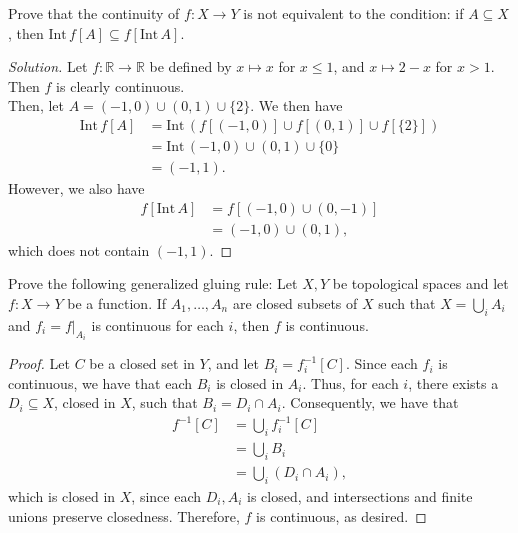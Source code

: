 \documentclass[12pt]{article}
\newenvironment{problem}[2][Problem]{\begin{trivlist}
\item[\hskip \labelsep {\bfseries #1}\hskip \labelsep {\bfseries #2.}]}{\end{trivlist}}
\newcommand{\Int}[1]{\text{Int}\,#1}
\newcommand{\R}{\mathbb{R}}
\newenvironment{solution}
  {\renewcommand\qedsymbol{$\blacksquare$}\begin{proof}[Solution]}
{\end{proof}}
\begin{document}
\newpage

\begin{problem}{6.7}
  Prove that the continuity of $f:X\to Y$ is not equivalent to the condition:
  if $A\subseteq X$, then $\Int f[A]\subseteq f[\Int A]$.
\end{problem}
\begin{solution}
  Let $f:\R\to\R$ be defined by $x\mapsto x$ for $x\leq 1$, and 
  $x\mapsto 2-x$ for $x>1$.
  Then $f$ is clearly continuous. \\
  \indent Then, let $A=(-1,0)\cup(0,1)\cup\{2\}$.
  We then have
  \begin{align*}
    \Int f[A] &= \Int(f[(-1,0)]\cup f[(0,1)]\cup f[\{2\}]) \\
    &= \Int(-1,0)\cup(0,1)\cup\{0\} \\
    &= (-1,1).
  \end{align*}
  However, we also have
  \begin{align*}
    f[\Int A] &= f[(-1,0)\cup(0,-1)]\\
    &= (-1,0)\cup(0,1),
  \end{align*}
  which does not contain $(-1,1)$.
\end{solution}

\begin{problem}{6.10}
  Prove the following generalized gluing rule: 
  Let $X,Y$ be topological spaces and let $f:X\to Y$ be a function.
  If $A_1,\dots,A_n$ are closed subsets of $X$ such that
  $X=\bigcup_i A_i$ and $f_i = f|_{A_i}$ is continuous for each $i$,
  then $f$ is continuous.
\end{problem}
\begin{proof}
  Let $C$ be a closed set in $Y$, and let $B_i = f_i^{-1}[C]$.
  Since each $f_i$ is continuous, we have that each $B_i$ is closed in $A_i$.
  Thus, for each $i$, there exists a $D_i\subseteq X$, closed in $X$, such
  that $B_i=D_i\cap A_i$.
  Consequently, we have that
  \begin{align*}
    f^{-1}[C] &= \bigcup_if_i^{-1}[C] \\
    &= \bigcup_iB_i \\
    &= \bigcup_i(D_i\cap A_i),
  \end{align*}
  which is closed in $X$, since each $D_i,A_i$ is closed, and intersections
  and finite unions preserve closedness.
  Therefore, $f$ is continuous, as desired.
\end{proof}
\end{document}
